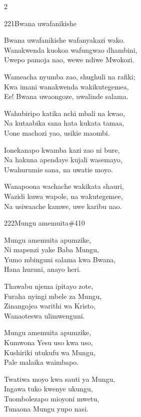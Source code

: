 \documentclass{article}
\begin{document}
\begin{multicols}{2}
\begin{hymn}{221}{Bwana uwafanikishe}{}
\begin{stanza}
Bwana uwafanikishe wafanyakazi wako.\\
Wanakwenda kuokoa wafungwao dhambini,\\
Uwepo pamoja nao, wewe ndiwe Mwokozi.
\end{stanza}
\begin{stanza}
Wameacha nyumba zao, shughuli na rafiki;\\
Kwa imani wanakwenda wakikutegemea,\\
Ee! Bwana uwaongoze, uwalinde salama.
\end{stanza}
\begin{stanza}
Wahubiripo katika nchi mbali na kwao,\\
Na kutaabika sana hata kukata tamaa,\\
Uone machozi yao, usikie maombi.
\end{stanza}
\begin{stanza}
Ionekanapo kwamba kazi zao ni bure,\\
Na hakuna apendaye kujali wasemayo,\\
Uwahurumie sana, na uwatie moyo.
\end{stanza}
\begin{stanza}
Wanapoona wachache wakikata shauri,\\
Wazidi kuwa wapole, na wakutegemee,\\
Na usiwaache kamwe, uwe karibu nao.
\end{stanza}
\end{hymn}

\begin{hymn}{222}{Mungu amemuita}{\#410}
\begin{stanza}
Mungu amemuita apumzike,\\
Ni mapenzi yake Baba Mungu,\\
Yumo mbinguni salama kwa Bwana,\\
Hana huzuni, anayo heri.
\end{stanza}
\begin{stanza}
Thawabu njema ipitayo zote,\\
Furaha nyingi mbele za Mungu,\\
Zinangojea warithi wa Kristo,\\
Wanaoteswa ulimwenguni.
\end{stanza}
\begin{stanza}
Mungu amemuita apumzike,\\
Kumwona Yesu uso kwa uso,\\
Kushiriki utukufu wa Mungu,\\
Pale malaika waimbapo.
\end{stanza}
\begin{stanza}
Twatiwa moyo kwa sauti ya Mungu,\\
Ingawa tuko kwenye ukungu,\\
Tuombolezapo mioyoni mwetu,\\
Tunaona Mungu yupo nasi.
\end{stanza}
\end{hymn}


\end{multicols}
\end{document}
